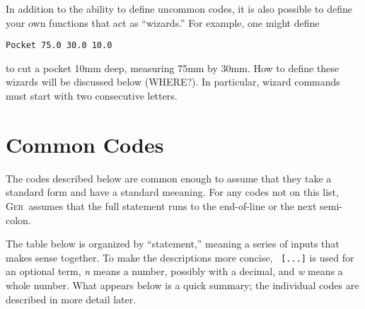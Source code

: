 \documentclass[titlepage,oneside,10pt]{article}
\newcommand{\ger}{\textsc{Ger}}
\begin{document}
In addition to the ability to define uncommon codes, it is also
possible to define your own functions that act as ``wizards.'' For
example, one might define
\begin{verbatim}
Pocket 75.0 30.0 10.0 
\end{verbatim}
to cut a pocket 10mm deep, measuring 75mm by 30mm. How to define these
wizards will be discussed below (WHERE?). In particular, wizard
commands must start with two consecutive letters.

\section{Common Codes}

The codes described below are common enough to assume that they take a
standard form and have a standard meeaning. For any codes not on this
list, \ger\ assumes that the full statement runs to the end-of-line or
the next semi-colon.

The table below is organized by ``statement,'' meaning a series of
inputs that makes sense together. To make the descriptions more concise, {\tt
  [...]} is used for an optional term, \emph{n} means a number,
possibly with a decimal, and \emph{w} means a whole number. What
appears below is a quick summary; the individual codes are described
in more detail later.
\end{document}
